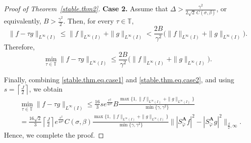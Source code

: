 \documentclass[10pt,a4paper]{amsart}
\begin{document}
\begin{proof}[Proof of Theorem~\ref{stable.thm2}]
\smallskip
\noindent
\textbf{Case 2.} Assume that $
\Delta>\frac{\gamma^2}{2\sqrt{2}\,C(\sigma,\beta)}$,
or equivalently, $
B>\frac{\gamma^2}{2}$. 
Then, for every $\tau\in\mathbb T$,
$$ \|f-\tau g\|_{L^\infty(I)} \le \|f\|_{L^\infty(I)}+\|g\|_{L^\infty(I)}
< \frac{2B}{\gamma^2} \bigl(\|f\|_{L^\infty(I)}+\|g\|_{L^\infty(I)}\bigr).$$
Therefore,
\begin{equation}\label{stable.thm.eq.case2}
\min_{\tau\in\mathbb T}\|f-\tau g\|_{L^\infty(I)} \le \frac{2B}{\gamma^2} \bigl(\|f\|_{L^\infty(I)}+\|g\|_{L^\infty(I)}\bigr).
\end{equation}

Finally, combining \eqref{stable.thm.eq.case1} and \eqref{stable.thm.eq.case2}, and using 
$ s=\left\lceil \frac{J}{2}\right\rceil$, 
we obtain
\begin{align*}
&\min_{\tau\in\mathbb T}\|f-\tau g\|_{L^\infty(I)} \le \frac{16}{3}se^{\frac{r^2}{4\sigma^2}}
B\frac{\max\{1,\|f\|_{L^\infty(I)}+\|g\|_{L^\infty(I)}\}}{\min\{\gamma,\gamma^2\}} \\
&=\frac{16\sqrt{2}}{3}\left\lceil \frac{J}{2}\right\rceil e^{\frac{r^2}{4\sigma^2}} C(\sigma,\beta)
\frac{\max\{1,\|f\|_{L^\infty(I)}+\|g\|_{L^\infty(I)}\}}{\min\{\gamma,\gamma^2\}}\bigl\| |S_{\check{\varphi}}^{\mathbf A}f|^2 - |S_{\check{\varphi}}^{\mathbf A}g|^2\bigr\|_{\frac{\beta}{2},\infty}.
\end{align*}
Hence, we complete the proof.
\end{proof}
\end{document}
